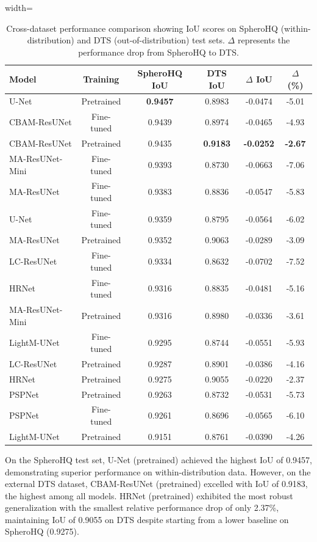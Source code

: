 \documentclass[preprint,12pt]{elsarticle}
\newcommand{\dsHQ}{SpheroHQ}
\newcommand{\dsDTS}{DTS}
\begin{document}
\begin{table}[h]
\centering
\caption{Cross-dataset performance comparison showing IoU scores on \dsHQ{} (within-distribution) and \dsDTS{} (out-of-distribution) test sets. $\Delta$ represents the performance drop from \dsHQ{} to \dsDTS{}.}
\label{tab:cross_dataset_performance}
\begin{adjustbox}{width=\textwidth}
\begin{tabular}{lccccc}
\toprule
\textbf{Model} & \textbf{Training} & \textbf{\dsHQ{} IoU} & \textbf{\dsDTS{} IoU} & \textbf{$\Delta$ IoU} & \textbf{$\Delta$ (\%)} \\
\midrule
U-Net & Pretrained & \textbf{0.9457} & 0.8983 & -0.0474 & -5.01 \\
CBAM-ResUNet & Fine-tuned & 0.9439 & 0.8974 & -0.0465 & -4.93 \\
CBAM-ResUNet & Pretrained & 0.9435 & \textbf{0.9183} & \textbf{-0.0252} & \textbf{-2.67} \\
MA-ResUNet-Mini & Fine-tuned & 0.9393 & 0.8730 & -0.0663 & -7.06 \\
MA-ResUNet & Fine-tuned & 0.9383 & 0.8836 & -0.0547 & -5.83 \\
U-Net & Fine-tuned & 0.9359 & 0.8795 & -0.0564 & -6.02 \\
MA-ResUNet & Pretrained & 0.9352 & 0.9063 & -0.0289 & -3.09 \\
LC-ResUNet & Fine-tuned & 0.9334 & 0.8632 & -0.0702 & -7.52 \\
HRNet & Fine-tuned & 0.9316 & 0.8835 & -0.0481 & -5.16 \\
MA-ResUNet-Mini & Pretrained & 0.9316 & 0.8980 & -0.0336 & -3.61 \\
LightM-UNet & Fine-tuned & 0.9295 & 0.8744 & -0.0551 & -5.93 \\
LC-ResUNet & Pretrained & 0.9287 & 0.8901 & -0.0386 & -4.16 \\
HRNet & Pretrained & 0.9275 & 0.9055 & -0.0220 & -2.37 \\
PSPNet & Pretrained & 0.9263 & 0.8732 & -0.0531 & -5.73 \\
PSPNet & Fine-tuned & 0.9261 & 0.8696 & -0.0565 & -6.10 \\
LightM-UNet & Pretrained & 0.9151 & 0.8761 & -0.0390 & -4.26 \\
\bottomrule
\end{tabular}
\end{adjustbox}
\end{table}

On the \dsHQ{} test set, U-Net (pretrained) achieved the highest IoU of 0.9457, demonstrating superior performance on within-distribution data. However, on the external \dsDTS{} dataset, CBAM-ResUNet (pretrained) excelled with IoU of 0.9183, the highest among all models. HRNet (pretrained) exhibited the most robust generalization with the smallest relative performance drop of only 2.37\%, maintaining IoU of 0.9055 on \dsDTS{} despite starting from a lower baseline on \dsHQ{} (0.9275).
\end{document}
